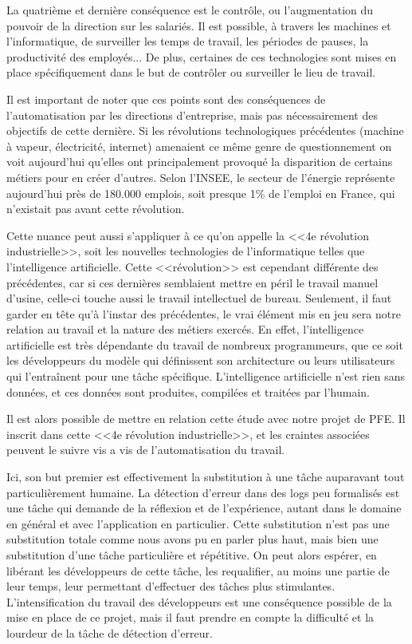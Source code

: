 \documentclass[openany, 11pt]{memoir}
\begin{document}
\bigskip
La quatrième et dernière conséquence est le contrôle, ou l'augmentation du pouvoir de la direction sur les salariés. Il est possible, à travers les machines et l'informatique, de surveiller les temps de travail, les périodes de pauses, la productivité des employés... De plus, certaines de ces technologies sont mises en place spécifiquement dans le but de contrôler ou surveiller le lieu de travail.

\bigskip
Il est important de noter que ces points sont des conséquences de l'automatisation par les directions d'entreprise, mais pas nécessairement des objectifs de cette dernière. Si les révolutions technologiques précédentes (machine à vapeur, électricité, internet) amenaient ce même genre de questionnement on voit aujourd'hui qu'elles ont principalement provoqué la disparition de certains métiers pour en créer d'autres. Selon l'INSEE, le secteur de l'énergie représente aujourd'hui près de 180.000 emplois, soit presque 1\% de l'emploi en France, qui n'existait pas avant cette révolution. 

Cette nuance peut aussi s'appliquer à ce qu'on appelle la <<4e révolution industrielle>>, soit les nouvelles technologies de l'informatique telles que l'intelligence artificielle. Cette <<révolution>> est cependant différente des précédentes, car si ces dernières semblaient mettre en péril le travail manuel d'usine, celle-ci touche aussi le travail intellectuel de bureau. Seulement, il faut garder en tête qu'à l'instar des précédentes, le vrai élément mis en jeu sera notre relation au travail et la nature des métiers exercés. En effet, l'intelligence artificielle est très dépendante du travail de nombreux programmeurs, que ce soit les développeurs du modèle qui définissent son architecture ou leurs utilisateurs qui l'entraînent pour une tâche spécifique. L'intelligence artificielle n'est rien sans données, et ces données sont produites, compilées et traitées par l'humain.

\bigskip
Il est alors possible de mettre en relation cette étude avec notre projet de PFE. Il inscrit dans cette <<4e révolution industrielle>>, et les craintes associées peuvent le suivre vis a vis de l'automatisation du travail.

Ici, son but premier est effectivement la substitution à une tâche auparavant tout particulièrement humaine. La détection d'erreur dans des \glspl{log} peu formalisés est une tâche qui demande de la réflexion et de l'expérience, autant dans le domaine en général et avec l'application en particulier. Cette substitution n'est pas une substitution totale comme nous avons pu en parler plus haut, mais bien une substitution d'une tâche particulière et répétitive. On peut alors espérer, en libérant les développeurs de cette tâche, les requalifier, au moins une partie de leur temps, leur permettant d'effectuer des tâches plus stimulantes. L'intensification du travail des développeurs est une conséquence possible de la mise en place de ce projet, mais il faut prendre en compte la difficulté et la lourdeur de la tâche de détection d'erreur.
\end{document}
